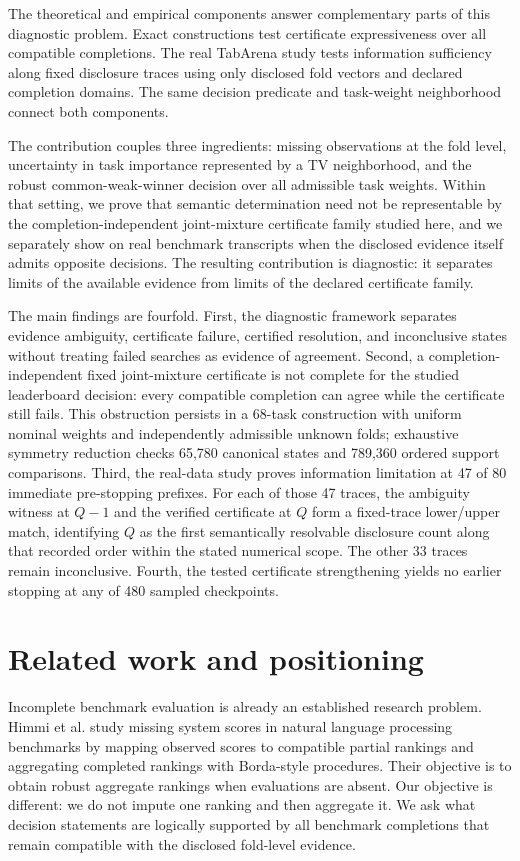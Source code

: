 \documentclass[preprint,11pt]{elsarticle}
\begin{document}
The theoretical and empirical components answer complementary parts of this diagnostic problem. Exact constructions test certificate expressiveness over all compatible completions. The real TabArena study tests information sufficiency along fixed disclosure traces using only disclosed fold vectors and declared completion domains. The same decision predicate and task-weight neighborhood connect both components.

The contribution couples three ingredients: missing observations at the fold level, uncertainty in task importance represented by a TV neighborhood, and the robust common-weak-winner decision over all admissible task weights. Within that setting, we prove that semantic determination need not be representable by the completion-independent joint-mixture certificate family studied here, and we separately show on real benchmark transcripts when the disclosed evidence itself admits opposite decisions. The resulting contribution is diagnostic: it separates limits of the available evidence from limits of the declared certificate family.

The main findings are fourfold. First, the diagnostic framework separates evidence ambiguity, certificate failure, certified resolution, and inconclusive states without treating failed searches as evidence of agreement. Second, a completion-independent fixed joint-mixture certificate is not complete for the studied leaderboard decision: every compatible completion can agree while the certificate still fails. This obstruction persists in a 68-task construction with uniform nominal weights and independently admissible unknown folds; exhaustive symmetry reduction checks 65,780 canonical states and 789,360 ordered support comparisons. Third, the real-data study proves information limitation at 47 of 80 immediate pre-stopping prefixes. For each of those 47 traces, the ambiguity witness at $Q-1$ and the verified certificate at $Q$ form a fixed-trace lower/upper match, identifying $Q$ as the first semantically resolvable disclosure count along that recorded order within the stated numerical scope. The other 33 traces remain inconclusive. Fourth, the tested certificate strengthening yields no earlier stopping at any of 480 sampled checkpoints.

\section{Related work and positioning}

Incomplete benchmark evaluation is already an established research problem. Himmi et al. \cite{r1} study missing system scores in natural language processing benchmarks by mapping observed scores to compatible partial rankings and aggregating completed rankings with Borda-style procedures. Their objective is to obtain robust aggregate rankings when evaluations are absent. Our objective is different: we do not impute one ranking and then aggregate it. We ask what decision statements are logically supported by all benchmark completions that remain compatible with the disclosed fold-level evidence.
\end{document}
